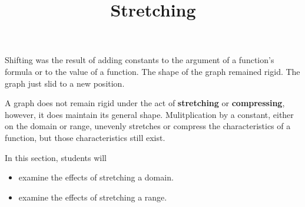 \documentclass{ximera}
\title{Stretching}
\begin{document}
\begin{abstract}
\end{abstract}
\maketitle




Shifting was the result of adding constants to the argument of a function's formula or to the value of a function.  The shape of the graph remained rigid. The graph just slid to a new position. 



A graph does not remain rigid under the act of \textbf{stretching} or \textbf{compressing}, however, it does maintain its general shape. Mulitplication by a constant, either on the domain or range, unevenly stretches or compress the characteristics of a function, but those characteristics still exist.






















\begin{sectionOutcomes}
In this section, students will 

\begin{itemize}
\item examine the effects of stretching a domain.
\item examine the effects of stretching a range.
\end{itemize}
\end{sectionOutcomes}
\end{document}
